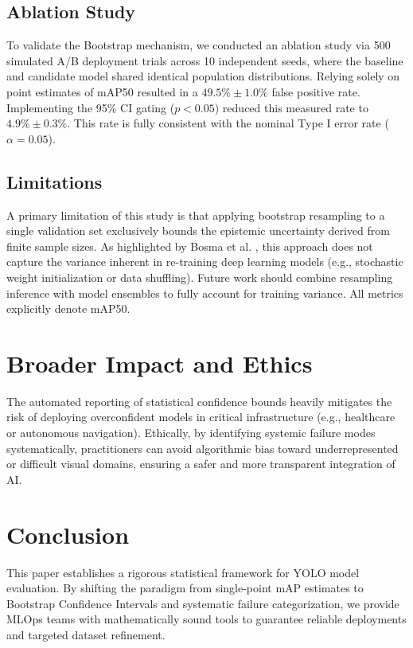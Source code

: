 \documentclass[conference]{IEEEtran}
\begin{document}
\subsection{Ablation Study}
To validate the Bootstrap mechanism, we conducted an ablation study via 500 simulated A/B deployment trials across 10 independent seeds, where the baseline and candidate model shared identical population distributions. Relying solely on point estimates of mAP50 resulted in a $49.5\%\pm1.0\%$ false positive rate. Implementing the 95\% CI gating ($p < 0.05$) reduced this measured rate to $4.9\%\pm0.3\%$. This rate is fully consistent with the nominal Type I error rate ($\alpha = 0.05$).

\subsection{Limitations}
A primary limitation of this study is that applying bootstrap resampling to a single validation set exclusively bounds the epistemic uncertainty derived from finite sample sizes. As highlighted by Bosma et al. \cite{bosma2024statistical}, this approach does not capture the variance inherent in re-training deep learning models (e.g., stochastic weight initialization or data shuffling). Future work should combine resampling inference with model ensembles to fully account for training variance. All metrics explicitly denote mAP50.

\section{Broader Impact and Ethics}
The automated reporting of statistical confidence bounds heavily mitigates the risk of deploying overconfident models in critical infrastructure (e.g., healthcare or autonomous navigation). Ethically, by identifying systemic failure modes systematically, practitioners can avoid algorithmic bias toward underrepresented or difficult visual domains, ensuring a safer and more transparent integration of AI.

\section{Conclusion}
This paper establishes a rigorous statistical framework for YOLO model evaluation. By shifting the paradigm from single-point mAP estimates to Bootstrap Confidence Intervals and systematic failure categorization, we provide MLOps teams with mathematically sound tools to guarantee reliable deployments and targeted dataset refinement.
\end{document}
